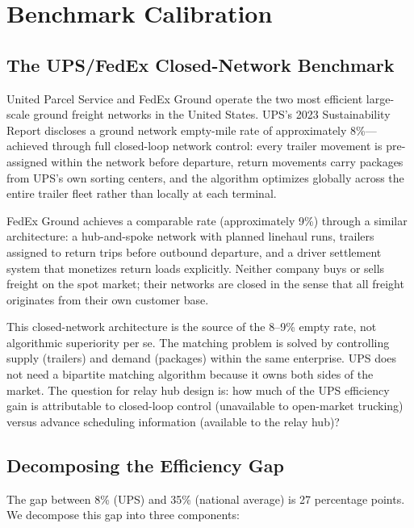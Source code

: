 \section{Benchmark Calibration}
\label{sec:benchmark}

\subsection{The UPS/FedEx Closed-Network Benchmark}

United Parcel Service and FedEx Ground operate the two most efficient large-scale ground freight networks in the United States. UPS's 2023 Sustainability Report discloses a ground network empty-mile rate of approximately 8\%---achieved through full closed-loop network control: every trailer movement is pre-assigned within the network before departure, return movements carry packages from UPS's own sorting centers, and the algorithm optimizes globally across the entire trailer fleet rather than locally at each terminal.

FedEx Ground achieves a comparable rate (approximately 9\%) through a similar architecture: a hub-and-spoke network with planned linehaul runs, trailers assigned to return trips before outbound departure, and a driver settlement system that monetizes return loads explicitly. Neither company buys or sells freight on the spot market; their networks are closed in the sense that all freight originates from their own customer base.

This closed-network architecture is the source of the 8--9\% empty rate, not algorithmic superiority per se. The matching problem is solved by controlling supply (trailers) and demand (packages) within the same enterprise. UPS does not need a bipartite matching algorithm because it owns both sides of the market. The question for relay hub design is: how much of the UPS efficiency gain is attributable to closed-loop control (unavailable to open-market trucking) versus advance scheduling information (available to the relay hub)?

\subsection{Decomposing the Efficiency Gap}

The gap between 8\% (UPS) and 35\% (national average) is 27 percentage points. We decompose this gap into three components:

